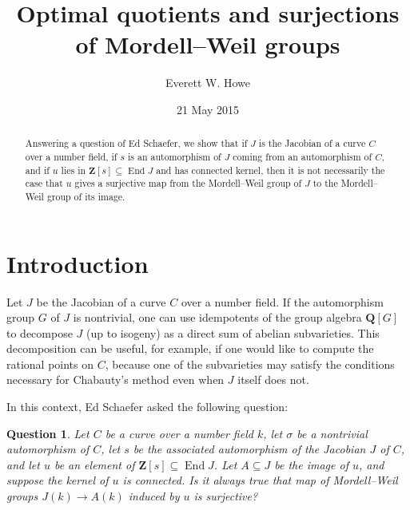\documentclass{amsart}
\newtheorem*{question}{Question}
\theoremstyle{remark}
\begin{document}
\title[Surjections of Mordell--Weil groups]
{Optimal quotients and surjections of Mordell--Weil groups}

\author{Everett W. Howe}
\address{Center for Communications Research,
        4320 Westerra Court,
        San Diego, CA 92121-1967, USA.}

\date{21 May 2015}


\begin{abstract}
Answering a question of Ed Schaefer, we show that if $J$ is the Jacobian of a
curve $C$ over a number field, if $s$ is an automorphism of $J$ coming from an 
automorphism of $C$, and if $u$ lies in ${{\mathbf{Z}}}[s]\subseteq\operatorname{End} J$ and has 
connected kernel, then it is not necessarily the case that $u$ gives a 
surjective map from the Mordell--Weil group of $J$ to the Mordell--Weil group
of its image.
\end{abstract}

\maketitle

\section{Introduction}
\label{S:intro}

Let $J$ be the Jacobian of a curve $C$ over a number field. If the automorphism
group $G$ of $J$ is nontrivial, one can use idempotents of the group algebra 
${{\mathbf{Q}}}[G]$ to decompose $J$ (up to isogeny) as a direct sum of abelian 
subvarieties.  This decomposition can be useful, for example, if one would like
to compute the rational points on $C$, because one of the subvarieties may 
satisfy the conditions necessary for Chabauty's method even when $J$ itself
does not.

In this context, Ed Schaefer asked the following question:

\begin{question}
\label{Q:Ed}
Let $C$ be a curve over a number field $k$, let $\sigma$ be a nontrivial
automorphism of $C$, let $s$ be the associated automorphism of the Jacobian $J$
of $C$, and let $u$ be an element of ${{\mathbf{Z}}}[s]\subseteq \operatorname{End} J$. Let 
$A\subseteq J$ be the image of $u$, and suppose the kernel of $u$ is connected.
Is it always true that map of Mordell--Weil groups $J(k)\to A(k)$ induced by
$u$ is surjective\textup{?}
\end{question}
\end{document}
